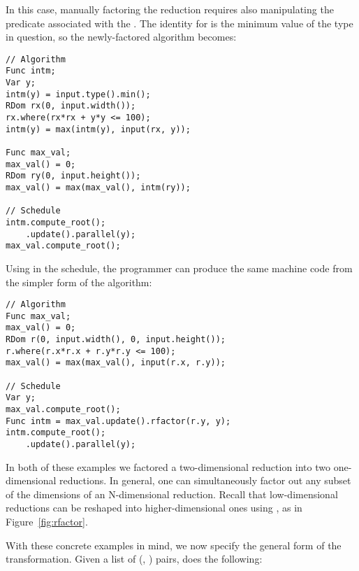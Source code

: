 In this case, manually factoring the reduction requires also manipulating the predicate associated with the . The identity for  is the minimum value of the type in question, so the newly-factored algorithm becomes:

\begin{lstlisting}
// Algorithm
Func intm;
Var y;
intm(y) = input.type().min();
RDom rx(0, input.width());
rx.where(rx*rx + y*y <= 100);
intm(y) = max(intm(y), input(rx, y));

Func max_val;
max_val() = 0;
RDom ry(0, input.height());
max_val() = max(max_val(), intm(ry));

// Schedule
intm.compute_root();
    .update().parallel(y);
max_val.compute_root();
\end{lstlisting}

Using  in the schedule, the programmer can produce the same machine code from the simpler form of the algorithm:

\begin{minipage}{\linewidth}
\begin{lstlisting}
// Algorithm
Func max_val;
max_val() = 0;
RDom r(0, input.width(), 0, input.height());
r.where(r.x*r.x + r.y*r.y <= 100);
max_val() = max(max_val(), input(r.x, r.y));

// Schedule
Var y;
max_val.compute_root();
Func intm = max_val.update().rfactor(r.y, y);
intm.compute_root();
    .update().parallel(y);
\end{lstlisting}
\end{minipage}

In both of these examples we factored a two-dimensional reduction into two one-dimensional reductions. In general, one can simultaneously factor out any subset of the dimensions of an N-dimensional reduction. Recall that low-dimensional reductions can be reshaped into higher-dimensional ones using , as in Figure~\ref{fig:rfactor}.

With these concrete examples in mind, we now specify the general form of the transformation. Given a list of (, ) pairs,  does the following:

